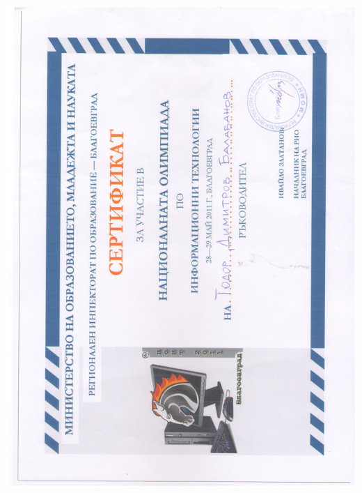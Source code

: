 \documentclass[bulgarian,a4paper]{europasscv}
\begin{document}
\includegraphics[width=\textwidth,height=\textheight,keepaspectratio]{ElSys2011}
\end{document}
